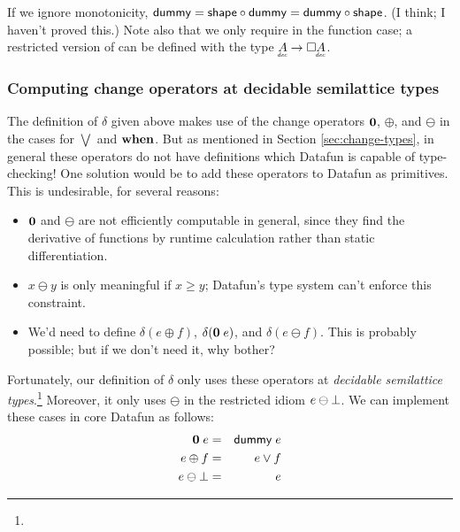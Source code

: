 \documentclass{rntz}
\newcommand{\dummy}{\ms{dummy}}
\begin{document}
If we ignore monotonicity, $\dummy = \ms{shape} \circ \dummy = \dummy \circ \ms{shape}$. (I think; I haven't proved this.)
%
Note also that we only require  in the function case; a restricted version of  can be defined with the type $\eq{A} \to \Disc{\eq{A}}$.


\subsubsection{Computing change operators at decidable semilattice types}
\label{sec:change-operators-at-decidable-semilattice-types}

The definition of $\delta$ given above makes use of the change operators $\mathbf{0}$, $\oplus$, and $\ominus$ in the cases for $\bigvee$ and $\mathbf{when}$.
%
But as mentioned in Section \ref{sec:change-types}, in general these operators do not have definitions which Datafun is capable of type-checking!
%
One solution would be to add these operators to Datafun as primitives.
%
This is undesirable, for several reasons:
\begin{itemize}
\item $\mathbf{0}$ and $\ominus$ are not efficiently computable in general, since
  they find the derivative of functions by runtime calculation rather than
  static differentiation.

\item $x \ominus y$ is only meaningful if $x \ge y$; Datafun's type system
  can't enforce this constraint.

\item We'd need to define $\delta(e \oplus f)$, $\delta(\mathbf{0}\;e)$, and
  $\delta(e \ominus f)$. This is probably possible; but if we don't need it, why
  bother?
\end{itemize}

Fortunately, our definition of $\delta$ only uses these operators at \emph{decidable semilattice types}.\footnote{} Moreover, it only uses $\ominus$ in the restricted idiom $e \ominus \bot$. We can implement these cases in core Datafun as follows:
%
\begin{eqnarray*}
  \zero\; e &=& \dummy\; e\\
  e \oplus f &=& e \vee f\\
  e \ominus \unit &=& e
\end{eqnarray*}

\end{document}
